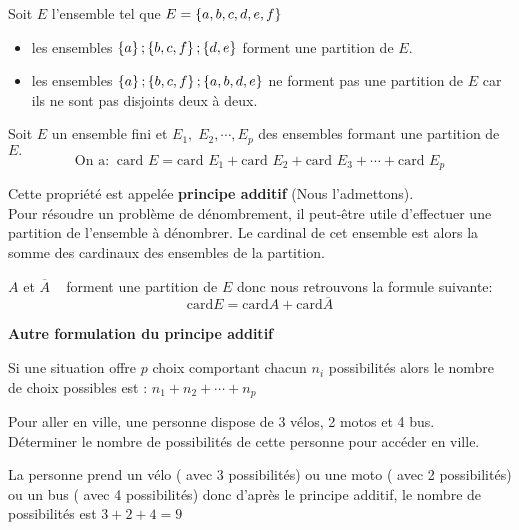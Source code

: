 \begin{example}

Soit $ E $ l'ensemble tel que $ E= \left\{a, b, c, d, e, f\right\} $
\begin{itemize}
\item[\textbullet] les ensembles  $ \left\{a\right\}; \left\{b, c,  f\right\}; \left\{d,e\right\} $ forment une partition de $ E. $
\item[\textbullet] les ensembles  $ \left\{a\right\}; \left\{b, c,  f\right\}; \left\{a, b,d,e\right\} $ ne  forment pas une partition de $ E$ car ils ne  sont pas disjoints deux à deux.
\end{itemize}
\end{example}
\begin{property}
Soit $ E $ un ensemble fini et  $ E_{1}, \; E_{2}, \cdots, E_{p} $ des ensembles formant une partition de $ E. $ 
 $$ \text{On a:}\;\;   \textrm{card }E= \textrm{card } E_{1}+ \textrm{card }E_{2} + \textrm{card }E_{3}+ \cdots + \textrm{card } E_{p}$$
\end{property}
Cette propriété est appelée \textbf{principe  additif }(Nous l'admettons).\\
Pour résoudre un problème de dénombrement, il peut-être utile d'effectuer une partition de l'ensemble à dénombrer. Le cardinal de cet ensemble est alors la somme des cardinaux des   ensembles de la partition.

\begin{remark}

 $A $ et $\overline{A} $ ~ forment une partition de $ E$ donc nous retrouvons la formule suivante:
\[ \textrm{card}E= \textrm{card}A +\textrm{card}\overline{A} \]
\end{remark}

\textbf{ Autre formulation du principe additif}

Si une situation offre $ p $ choix comportant chacun $ n_{i} $ possibilités alors le nombre de choix possibles est :
$n_{1}+ n_{2}+ \cdots + n_{p} $

\begin{example}

 Pour aller en ville, une personne dispose de 3 vélos, 2 motos  et 4 bus.\\
Déterminer le nombre de possibilités de cette personne pour accéder en ville.

  La personne prend un vélo ( avec 3 possibilités) ou une moto ( avec 2 possibilités) ou un bus ( avec 4 possibilités) donc d'après le principe additif,  le nombre de possibilités est $ 3+2+4= 9$ 
\end{example}

